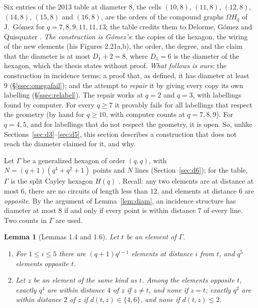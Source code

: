 \documentclass[11pt]{amsart}
\newtheorem{lemma}[theorem]{Lemma}
\theoremstyle{definition}
\theoremstyle{remark}
\begin{document}
Six entries of the 2013 table at diameter $8$, the cells $(10,8)$, $(11,8)$, $(12,8)$, $(14,8)$, $(15,8)$ and $(16,8)$, are the orders of the compound graphs $\Omega H_q$ of J.~G\'omez \cite[\S2.9.3]{G86} for $q=7,8,9,11,11,13$; the table credits them to Delorme, G\'omez and Quisquater \cite{DGQ}. \emph{The construction is G\'omez's}: the copies of the hexagon, the wiring of the new elements (his Figures 2.21a,b), the order, the degree, and the claim that the diameter is at most $D_1+2=8$, where $D_1=6$ is the diameter of the hexagon, which the thesis states without proof. \emph{What follows is ours}: the construction in incidence terms; a proof that, as defined, it has diameter at least $9$ (\S\ref{ssec:omegafail}); and the attempt to \emph{repair} it by giving every copy its own labelling (\S\ref{ssec:relabel}). The repair works at $q=2$ and $q=3$, with labellings found by computer. For every $q\ge7$ it provably fails for all labellings that respect the geometry (by hand for $q\ge10$, with computer counts at $q=7,8,9$). For $q=4,5$, and for labellings that do not respect the geometry, it is open. So, unlike Sections~\ref{sec:d3}--\ref{sec:d5}, this section describes a construction that does not reach the diameter claimed for it, and why.

Let $\Gamma$ be a generalized hexagon of order $(q,q)$, with $N=(q+1)(q^4+q^2+1)$ points and $N$ lines (Section~\ref{sec:d6}); for the table, $\Gamma$ is the split Cayley hexagon $H(q)$ \cite{T59,VM98}. Recall: any two elements are at distance at most $6$, there are no circuits of length less than $12$, and elements at distance $6$ are \emph{opposite}. By the argument of Lemma~\ref{lem:diam}, an incidence structure has diameter at most $8$ if and only if every point is within distance $7$ of every line. Two counts in $\Gamma$ are used.

\begin{lemma}[Lemmas 1.4 and 1.6]\label{lem:hexcounts}
Let $t$ be an element of $\Gamma$.
\begin{enumerate}[label=\textup{(\alph*)}]
\item For $1\le i\le5$ there are $(q+1)q^{i-1}$ elements at distance $i$ from $t$, and $q^5$ elements opposite $t$.
\item Let $z$ be an element of the same kind as $t$. Among the elements opposite $t$, exactly $q^4$ are within distance $4$ of $z$ if $z\ne t$, and none if $z=t$; exactly $q^2$ are within distance $2$ of $z$ if $d(t,z)\in\{4,6\}$, and none if $d(t,z)\le 2$.
\end{enumerate}
\end{lemma}
\end{document}
